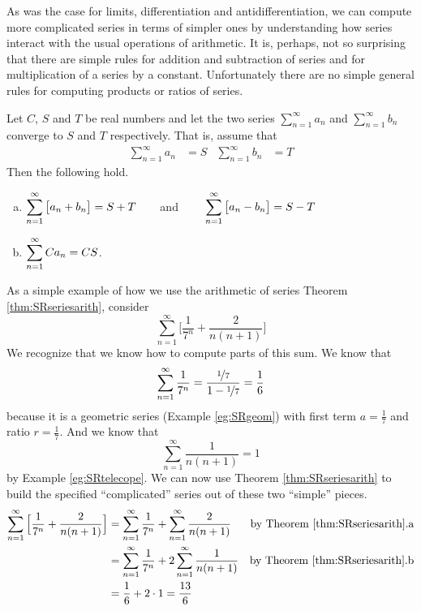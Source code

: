 As was the case for limits, differentiation and antidifferentiation,
we can compute more complicated series in
terms of simpler ones by understanding how series interact
with the usual operations of arithmetic. It is, perhaps,
not so surprising that there are simple rules for addition and subtraction
of series and for multiplication of a series by a constant. Unfortunately
there are no simple general rules for computing products or ratios of series.
\begin{theorem}\label{thm:SRseriesarith}
  Let $C$, $S$ and $T$ be real numbers and let the two series
$\sum_{n=1}^\infty a_n$ and  $\sum_{n=1}^\infty b_n$
converge to $S$ and $T$ respectively. That is, assume that
 \begin{align*}
  \sum_{n=1}^\infty a_n&=S & \sum_{n=1}^\infty b_n &=T
\end{align*}
  Then the following hold.
\begin{enumerate}[(a)]
 \item $\displaystyle \sum_{n=1}^\infty \big[a_n+b_n\big] = S+T\qquad$and
 $\qquad\displaystyle \sum_{n=1}^\infty \big[a_n-b_n\big] = S-T$
      \\
\item $\displaystyle \sum_{n=1}^\infty C a_n = C S$.
\end{enumerate}
\end{theorem}

\begin{eg}\label{eg:SRseriesarith}
As a simple example of how we use the arithmetic of series Theorem
\ref{thm:SRseriesarith}, consider
\begin{equation*}
\sum_{n=1}^\infty\Big[\frac{1}{7^n}+\frac{2}{n(n+1)}\Big]
\end{equation*}
We recognize that we know how to compute parts of this sum.
We know that
\begin{equation*}
\sum_{n=1}^\infty\frac{1}{7^n}=\frac{\nicefrac{1}{7}}{1-\nicefrac{1}{7}}
=\frac{1}{6}
\end{equation*}
because it is a geometric series (Example \ref{eg:SRgeom}) with
first term $a=\frac{1}{7}$ and ratio $r=\frac{1}{7}$. And we
know that
\begin{equation*}
\sum_{n=1}^\infty\frac{1}{n(n+1)} =1
\end{equation*}
by Example \ref{eg:SRtelecope}. We can now use Theorem
\ref{thm:SRseriesarith} to build the specified ``complicated''
series out of these two ``simple'' pieces.
\begin{align*}
\sum_{n=1}^\infty\Big[\frac{1}{7^n}+\frac{2}{n(n+1)}\Big]
&=\sum_{n=1}^\infty \frac{1}{7^n}
   +\sum_{n=1}^\infty\frac{2}{n(n+1)}
 & \text{by Theorem \ref{thm:SRseriesarith}.a} \\
&= \sum_{n=1}^\infty\frac{1}{7^n}
  +2 \sum_{n=1}^\infty \frac{1}{n(n+1)}
 & \text{by Theorem \ref{thm:SRseriesarith}.b} \\
&=\frac{1}{6}+2\cdot 1 =\frac{13}{6}
\end{align*}
\end{eg}



